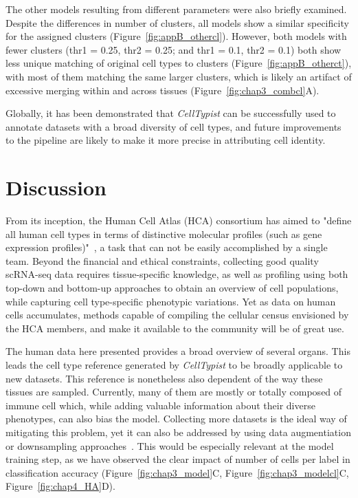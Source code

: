 The other models resulting from different parameters were also briefly examined. Despite the differences in number of clusters, all models show a similar specificity for the assigned clusters (Figure~\ref{fig:appB_othercl}). However, both models with fewer clusters (thr1 = 0.25, thr2 = 0.25; and thr1 = 0.1, thr2 = 0.1) both show less unique matching of original cell types to clusters (Figure~\ref{fig:appB_otherct}), with most of them matching the same larger clusters, which is likely an artifact of excessive merging within and across tissues (Figure~\ref{fig:chap3_combcl}A). 

Globally, it has been demonstrated that \textit{CellTypist} can be successfully used to annotate datasets with a broad diversity of cell types, and future improvements to the pipeline are likely to make it more precise in attributing cell identity. 


\section{Discussion}
\label{section4.3}
From its inception, the Human Cell Atlas (HCA) consortium has aimed to "define all human cell types in terms of distinctive molecular profiles (such as gene expression profiles)"~\citep{regev_human_2017}, a task that can not be easily accomplished by a single team. Beyond the financial and ethical constraints, collecting good quality scRNA-seq data requires tissue-specific knowledge, as well as profiling using both top-down and bottom-up approaches to obtain an overview of cell populations, while capturing cell type-specific phenotypic variations. Yet as data on human cells accumulates, methods capable of compiling the cellular census envisioned by the HCA members, and make it available to the community will be of great use.

The human data here presented provides a broad overview of several organs. This leads the cell type reference generated by \textit{CellTypist} to be broadly applicable to new datasets. This reference is nonetheless also dependent of the way these tissues are sampled. Currently, many of them are mostly or totally composed of immune cell which, while adding valuable information about their diverse phenotypes, can also bias the model. Collecting more datasets is the ideal way of mitigating this problem, yet it can also be addressed by using data augmentiation or downsampling approaches~\citep{wong_understanding_2016,hie_geometric_2019}. This would be especially relevant at the model training step, as we have observed the clear impact of number of cells per label in classification accuracy (Figure~\ref{fig:chap3_model}C, Figure~\ref{fig:chap3_modelcl}C, Figure~\ref{fig:chap4_HA}D).

